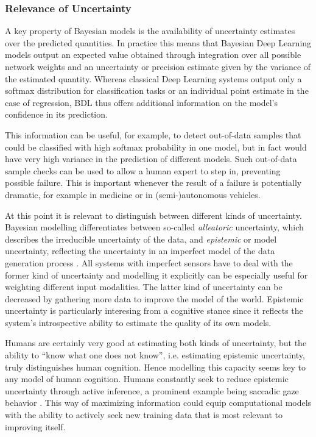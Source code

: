 \documentclass[10pt,a4paper,twocolumn]{article}
\begin{document}
\subsubsection{Relevance of Uncertainty}

A key property of Bayesian models is the availability of uncertainty estimates over the predicted quantities. In practice this means that Bayesian Deep Learning models output an expected value obtained through integration over all possible network weights and an uncertainty or precision estimate given by the variance of the estimated quantity. Whereas classical Deep Learning systems output only a softmax distribution for classification tasks or an individual point estimate in the case of regression, BDL thus offers additional information on the model's confidence in its prediction.

This information can be useful, for example, to detect out-of-data samples that could be classified with high softmax probability in one model, but in fact would have very high variance in the prediction of different models. Such out-of-data sample checks can be used to allow a human expert to step in, preventing possible failure. This is important whenever the result of a failure is potentially dramatic, for example in medicine or in (semi-)autonomous vehicles.

At this point it is relevant to distinguish between different kinds of uncertainty. Bayesian modelling differentiates between so-called \emph{alleatoric} uncertainty, which describes the irreducible uncertainty of the data, and \emph{epistemic} or model uncertainty, reflecting the uncertainty in an imperfect model of the data generation process \cite{kendall2017uncertainties}. All systems with imperfect sensors have to deal with the former kind of uncertainty and modelling it explicitly can be especially useful for weighting different input modalities. The latter kind of uncertainty can be decreased by gathering more data to improve the model of the world. Epistemic uncertainty is particularly interesing from a cognitive stance since it reflects the system's introspective ability to estimate the quality of its own models. 

Humans are certainly very good at estimating both kinds of uncertainty, but the ability to ``know what one does not know'', i.e. estimating epistemic uncertainty, truly distinguishes human cognition. Hence modelling this capacity seems key to any model of human cognition. Humans constantly seek to reduce epistemic uncertainty through active inference, a prominent example being saccadic gaze behavior \cite{mirza2018human}.
This way of maximizing information could equip computational models with the ability to actively seek new training data that is most relevant to improving itself. 
\end{document}
